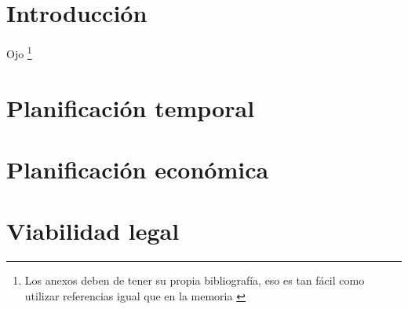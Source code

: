 
\section{Introducción}

Ojo \footnote{Los anexos deben de tener su propia bibliografía, eso es tan fácil como utilizar referencias igual que en la memoria \cite{bortolot2005}}

\section{Planificación temporal}

\section{Planificación económica}

\section{Viabilidad legal}